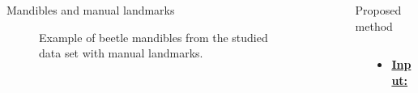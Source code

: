 \documentclass{LaBRI_poster}
\begin{document}
\begin{frame}[t]
\begin{columns}[t]
\begin{column}{\threecolwidth}
\begin{block}{Mandibles and manual landmarks}
\begin{figure}[h]
\caption{Example of beetle mandibles from the studied data set with
  manual landmarks.}
\label{fig1}
\end{figure}
\end{block}
\end{column}
\begin{column}{\sepwidth}\end{column} %
\begin{column}{\twothirdcolwidth}
\begin{block}{Proposed method}
	\begin{columns}[t]
		\begin{column}{\sepwidth}\end{column}
		\begin{column}{\fourcolwidth}
			\begin{itemize}
				\item \textbf{\underline{Input:}} 
					

\end{itemize}
\end{column}
\end{columns}
\end{block}
\end{column}
\end{columns}
\end{frame}
\end{document}
